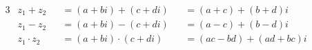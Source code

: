 \parbox{0.7\linewidth}
{
    \begin{alignat*}{3}
        &z_1 + z_2       &&= (a + bi) + (c + di)     &&= (a + c) + (b + d)i \\
        &z_1 - z_2       &&= (a + bi) - (c + di)     &&= (a - c) + (b - d)i \\
        &z_1 \cdot z_2   &&= (a + bi) \cdot (c + di) &&= (ac - bd) + (ad + bc)i
    \end{alignat*}
}